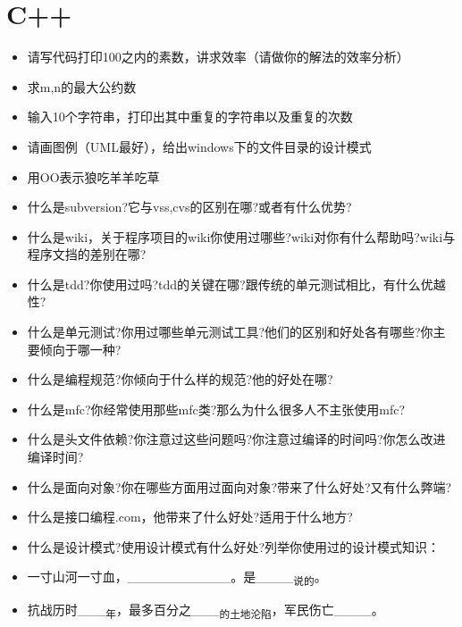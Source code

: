 \documentclass[9pt, b5paper]{article}
\begin{document}
\section{C++}
\label{sec:orgd8b7854}
\begin{itemize}
\item 请写代码打印100之内的素数，讲求效率（请做你的解法的效率分析）
\item 求m,n的最大公约数
\item 输入10个字符串，打印出其中重复的字符串以及重复的次数
\item 请画图例（UML最好），给出windows下的文件目录的设计模式
\item 用OO表示狼吃羊羊吃草
\item 什么是subversion?它与vss,cvs的区别在哪?或者有什么优势?
\item 什么是wiki，关于程序项目的wiki你使用过哪些?wiki对你有什么帮助吗?wiki与程序文挡的差别在哪?
\item 什么是tdd?你使用过吗?tdd的关键在哪?跟传统的单元测试相比，有什么优越性?
\item 什么是单元测试?你用过哪些单元测试工具?他们的区别和好处各有哪些?你主要倾向于哪一种?
\item 什么是编程规范?你倾向于什么样的规范?他的好处在哪?
\item 什么是mfc?你经常使用那些mfc类?那么为什么很多人不主张使用mfc?
\item 什么是头文件依赖?你注意过这些问题吗?你注意过编译的时间吗?你怎么改进编译时间?
\item 什么是面向对象?你在哪些方面用过面向对象?带来了什么好处?又有什么弊端?
\item 什么是接口编程.com，他带来了什么好处?适用于什么地方?
\item 什么是设计模式?使用设计模式有什么好处?列举你使用过的设计模式知识：
\item 一寸山河一寸血，\_\_\_\_\_\_\_\_\_\_\_。是\_\_\_\_\textsubscript{说的}。
\item 抗战历时\_\_\_\textsubscript{年}，最多百分之\_\_\_\textsubscript{的土地沦陷}，军民伤亡\_\_\_\_。
\end{itemize}
\end{document}

